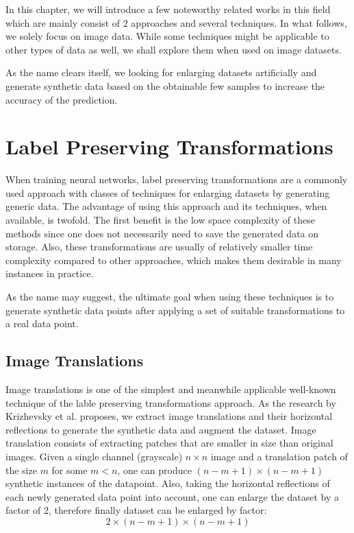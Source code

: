 In this chapter, we will introduce a few noteworthy related works in this field which are mainly consist of $2$ approaches and several techniques.
In what follows, we solely focus on image data.  While some techniques might be applicable to other
types of data as well, we shall explore them when used on image datasets.

As the name clears itself, we looking for enlarging datasets artificially and generate synthetic
data based on the obtainable few samples to increase the accuracy of the prediction.

\section{Label Preserving Transformations}
\label{tit:label-preserving}
When training neural networks, label preserving transformations are a commonly used approach with classes of
techniques for enlarging datasets by generating generic data. The advantage of using this approach
and its techniques, when available, is twofold. The first benefit is the low space complexity of these
methods since one does not necessarily need to save the generated data on storage. Also, these
transformations are usually of relatively smaller time complexity compared to other approaches,
which makes them desirable in many instances in practice.

As the name may suggest, the ultimate goal when using these techniques is to generate synthetic data points after applying a set of suitable transformations to a real data point.

\subsection{Image Translations}
Image translations is one of the simplest and meanwhile applicable well-known technique of the lable
preserving transformations approach. As the research by Krizhevsky et al.
\cite{image_translation_paper} proposes, we extract
image translations and their horizontal reflections to generate the synthetic data and augment the
dataset. Image translation consists of extracting patches that are smaller in size than original
images. Given a single channel (grayscale) $n \times n$ image and a translation patch of the size
$m$ for some $m<n$, one can produce $(n-m+1) \times (n-m+1) $ synthetic instances of the datapoint. Also, taking
the horizontal reflections of each newly generated data point into account, one can enlarge the
dataset by a factor of 2, therefore finally dataset can be enlarged by factor: $$2\times(n-m+1)\times(n-m+1)$$ 

